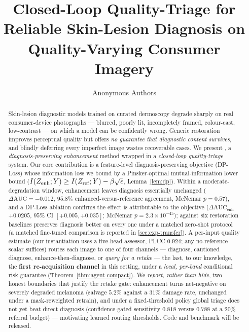 \documentclass[runningheads]{llncs}
\title{Closed-Loop Quality-Triage for Reliable Skin-Lesion Diagnosis
on Quality-Varying Consumer Imagery}
\author{Anonymous Authors}
\institute{Anonymous Institution \email{anonymous@example.com}}
\begin{document}
\maketitle

\begin{abstract}
Skin-lesion diagnostic models trained on curated dermoscopy degrade sharply on real consumer-device
photographs --- blurred, poorly lit, incompletely framed, colour-cast, low-contrast --- on which a
model can be confidently wrong. Generic restoration improves perceptual quality but offers \emph{no
guarantee that diagnostic content survives}, and blindly deferring every imperfect image wastes
recoverable cases. We present \visienhance, a \emph{diagnosis-preserving enhancement} method wrapped in
a \emph{closed-loop quality-triage} system. Our core contribution is a feature-level
diagnosis-preserving objective (DP-Loss) whose information loss we bound by a Pinsker-optimal
mutual-information lower bound ($I(Z_{\mathrm{enh}};Y)\geq I(Z_{\mathrm{ref}};Y)-\beta\sqrt{\epsilon}$, Lemma~\ref{lem:dp}).
Within a moderate-degradation window, enhancement leaves diagnosis essentially unchanged
($\Delta\mathrm{AUC}=-0.012$, $95.8\%$ enhanced-versus-reference agreement, McNemar $p=0.57$), and a
DP-Loss ablation confirms the effect is attributable to the objective ($\Delta\mathrm{AUC}_{\text{enh}}$
$+0.0205$, $95\%$ CI $[+0.005,+0.035]$; McNemar $p=2.3\times10^{-45}$); against six restoration
baselines \visienhance{} preserves diagnosis better on every one under a matched zero-shot protocol (a matched fine-tuned comparison is reported in \cref{sec:exp-transfer}). A per-input quality estimate (our
instantiation uses a five-head assessor, PLCC $0.924$; any no-reference scalar suffices) routes each
image to one of four channels --- diagnose, cautioned diagnose, enhance-then-diagnose, or \emph{query
for a retake} --- the last, to our knowledge, the \textbf{first re-acquisition channel} in this
setting, under a \emph{local, per-band} conditional risk guarantee (Theorem~\ref{thm:agent-compact}).
We \emph{report, rather than hide}, two honest boundaries that justify the retake gate: enhancement
turns net-negative on severely degraded melanoma (salvage $5.2\%$ against a $31\%$ damage rate,
unchanged under a mask-reweighted retrain), and under a fixed-threshold policy global triage does not
yet beat direct diagnosis (confidence-gated sensitivity $0.818$ versus $0.788$ at a $20\%$ referral
budget) --- motivating learned routing thresholds. Code and benchmark will be released.
\end{abstract}
\end{document}
